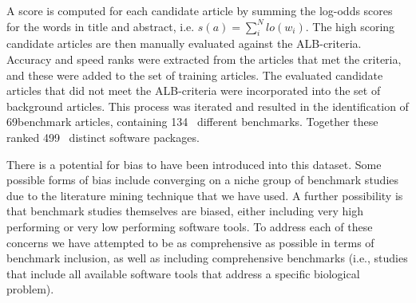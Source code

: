 \documentclass{bmcart}
\def\numTools{499}
\def\numBenchmarkPubs{69}
\def\numBenchmarks{134}
\begin{document}
A score is computed for each candidate article by summing the log-odds
scores for the words in title and abstract,
i.e. $s(a)=\sum_i^Nlo(w_i)$. The high scoring candidate articles are
then manually evaluated against the ALB-criteria. Accuracy and speed
ranks were extracted from the articles that met the criteria, and
these were added to the set of training articles. The evaluated
candidate articles that did not meet the ALB-criteria were incorporated
into the set of background articles. This process was iterated and resulted in the identification of
\numBenchmarkPubs benchmark articles,
containing \numBenchmarks~ different benchmarks. Together these
ranked \numTools~ distinct software packages.

There is a potential for bias to have been introduced into this
dataset. Some possible forms of bias include converging on a niche
group of benchmark studies due to the literature mining technique that
we have used. A further possibility is that benchmark studies
themselves are biased, either including very high performing or very
low performing software tools. To address each of these concerns we
have attempted to be as comprehensive as possible in terms of
benchmark inclusion, as well as including comprehensive benchmarks (i.e.,
studies that include all available software tools that
address a specific biological problem).
\end{document}
